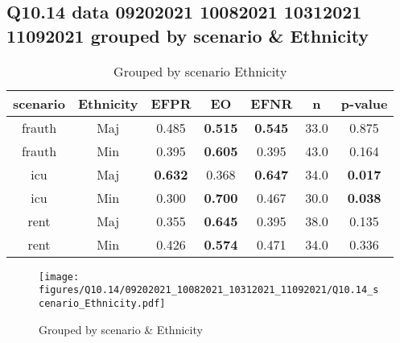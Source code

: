 \subsection{Q10.14 data 09202021 10082021 10312021 11092021 grouped by scenario \& Ethnicity}

\begin{comment}
                   EFPR        EO      EFNR     n    pvalue
(frauth, Maj)  0.484848  0.515152  0.545455  33.0  0.874852
(frauth, Min)  0.395349  0.604651  0.395349  43.0  0.163535
(icu, Maj)     0.632353  0.367647  0.647059  34.0  0.017466
(icu, Min)     0.300000  0.700000  0.466667  30.0  0.037917
(rent, Maj)    0.355263  0.644737  0.394737  38.0  0.134723
(rent, Min)    0.426471  0.573529  0.470588  34.0  0.335670
\end{comment}

\begin{table}[h]
    \centering
    \begin{tabular}{|c|c|c|c|c|c|c|}
        \hline
        scenario & Ethnicity & EFPR & EO & EFNR & n & p-value\\
        \hline
        frauth & Maj & 0.485 & \textbf{0.515} & \textbf{0.545} & 33.0 & 0.875\\
		frauth & Min & 0.395 & \textbf{0.605} & 0.395 & 43.0 & 0.164\\
		icu & Maj & \textbf{0.632} & 0.368 & \textbf{0.647} & 34.0 & \textbf{0.017}\\
		icu & Min & 0.300 & \textbf{0.700} & 0.467 & 30.0 & \textbf{0.038}\\
		rent & Maj & 0.355 & \textbf{0.645} & 0.395 & 38.0 & 0.135\\
		rent & Min & 0.426 & \textbf{0.574} & 0.471 & 34.0 & 0.336\\
		
        \hline
    \end{tabular}
    \caption{Grouped by scenario Ethnicity}
    \label{tab:my_label}
\end{table}
\begin{figure}[h]
    \centering
    \texttt{[image: figures/Q10.14/09202021\_10082021\_10312021\_11092021/Q10.14\_scenario\_Ethnicity.pdf]}
    \caption{Grouped by scenario \& Ethnicity}
    \label{fig:my_label}
\end{figure}
